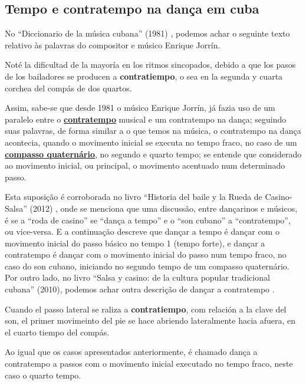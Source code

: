 \subsection{Tempo e contratempo na dança em cuba}
\label{subsec:contratempocuba}
No ``Diccionario de la música cubana'' (1981) 
\cite[pp. 113]{orovio1981diccionario} \cite[pp. 57]{santana2005merengue},
podemos achar o seguinte texto relativo às palavras do compositor e músico Enrique Jorrín.
\begin{citando}
Noté la dificultad de la mayoría en los ritmos sincopados, 
debido a que los pasos de los bailadores se producen a \textbf{contratiempo},
o sea en la segunda y cuarta corchea del compás de dos quartos.
\end{citando}
Assim, sabe-se que desde 1981 o músico Enrique Jorrín, 
já fazia uso de um paralelo entre o \hyperref[sec:contratempo]{\textbf{contratempo}} 
musical e um contratempo na dança;
seguindo suas palavras, de forma similar a o que temos na música, o contratempo na dança acontecia,
quando o movimento inicial se executa no tempo fraco, 
no caso de um \hyperref[subsec:compassoquaternario]{\textbf{compasso quaternário}},
no segundo e quarto tempo;
se entende que considerado ao movimento inicial, ou principal, o movimento acentuado num determinado passo.

Esta suposição é corroborada no livro ``Historia del baile y la Rueda de Casino-Salsa'' (2012) \cite{borges2012historia},
onde se menciona que uma discussão, entre dançarinos e músicos,
é se a ``roda de casino'' se ``dança a tempo'' e o ``son cubano'' a ``contratempo'',
ou vice-versa. E a continuação descreve que dançar a tempo
é dançar com o movimento inicial do passo básico no tempo 1 (tempo forte),
e dançar a contratempo é dançar com o movimento inicial do passo num tempo fraco, 
no caso do son cubano, iniciando no segundo tempo de um compasso quaternário.
Por outro lado, no livro ``Salsa y casino: de la cultura popular tradicional cubana'' (2010),
podemos achar outra descrição de dançar a contratempo \cite[pp. 63]{gutierrez2010salsa}.
\begin{citando}
Cuando el passo lateral se raliza a \textbf{contratiempo},
com relación a la clave del son,
el primer movimeinto del pie se hace abriendo lateralmente hacia afuera,
en el cuarto tiempo del compás.
\end{citando}
Ao igual que os casos apresentados anteriormente,
é chamado dança a contratempo a passos com o movimento inicial  executado no tempo fraco,
neste caso o quarto tempo.

